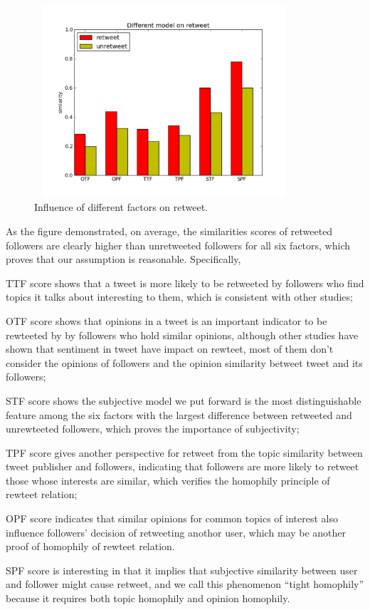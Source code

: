\documentclass[preprint,times]{elsarticle}
\begin{document}
\begin{figure}[htb]
\centering
\includegraphics[width=3.8in,height=2.8in]{component.pdf}
\caption{Influence of different factors on retweet.}
\label{fig:graph6}
\end{figure}
As the figure demonstrated, on average, the similarities scores of retweeted followers are clearly higher than unretweeted followers for all six factors, which proves that our assumption is reasonable. Specifically,
\begin{itemize*}
\item TTF score shows that a tweet is more likely to be retweeted by followers who find topics it talks about interesting to them, which is consistent with other studies\cite{conf/icwsm/MacskassyM11, conf/wsdm/FengW13};
\item OTF score shows that opinions in a tweet is an important indicator to be rewteeted by by followers who hold similar opinions, although other studies\cite{conf/icwsm/PfitznerGS12,2011:NaveedGKC} have shown that sentiment in tweet have impact on rewteet, most of them don't consider the opinions of followers and the opinion similarity betweet tweet and its followers;
\item STF score shows the subjective model we put forward is the most distinguishable feature among the six factors with the largest difference between retweeted and unrewteeted followers, which proves the importance of subjectivity;
\item TPF score gives another perspective for retweet from the topic similarity between tweet publisher and followers, indicating that followers are more likely to retweet those whose interests are similar, which verifies the homophily principle of rewteet relation;
\item OPF score indicates that similar opinions for common topics of interest also influence followers' decision of retweeting anothor user, which may be another proof of homophily of rewteet relation.
\item SPF score is interesting in that it implies that subjective similarity between user and follower might cause retweet, and we call this phenomenon ``tight homophily'' because it requires both topic homophily and opinion homophily.
\end{itemize*} 
\end{document}
